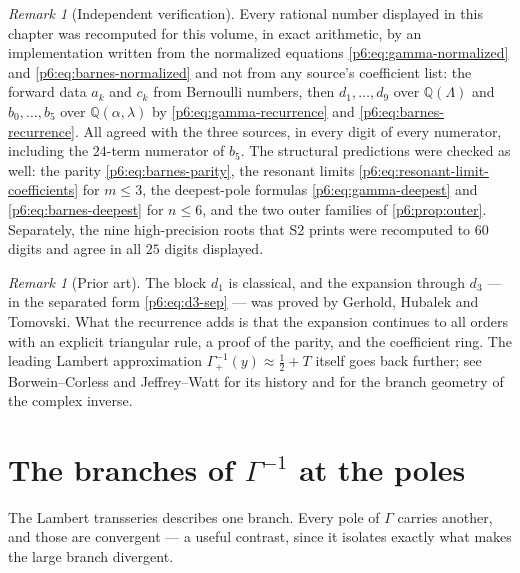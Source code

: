 \documentclass[11pt,a4paper,oneside]{book}
\theoremstyle{plain}
\theoremstyle{definition}
\theoremstyle{remark}
\newtheorem{remark}[theorem]{Remark}
\newcommand{\Rat}{\mathbb{Q}}
\begin{document}
\begin{remark}[Independent verification]\label{p6:rem:verification}
Every rational number displayed in this chapter was recomputed for this
volume, in exact arithmetic, by an implementation written from the normalized
equations \eqref{p6:eq:gamma-normalized} and \eqref{p6:eq:barnes-normalized}
and not from any source's coefficient list: the forward data $a_k$ and $c_k$
from Bernoulli numbers, then $d_1,\dots,d_9$ over $\Rat(\Lambda)$ and
$b_0,\dots,b_5$ over $\Rat(\alpha,\lambda)$ by \eqref{p6:eq:gamma-recurrence}
and \eqref{p6:eq:barnes-recurrence}.  All agreed with the three sources, in
every digit of every numerator, including the $24$-term numerator of $b_5$.
The structural predictions were checked as well: the parity
\eqref{p6:eq:barnes-parity}, the resonant limits
\eqref{p6:eq:resonant-limit-coefficients} for $m\le3$, the deepest-pole
formulas \eqref{p6:eq:gamma-deepest} and \eqref{p6:eq:barnes-deepest} for
$n\le6$, and the two outer families of \cref{p6:prop:outer}.  Separately, the
nine high-precision roots that S2 prints were recomputed to $60$ digits and
agree in all $25$ digits displayed.
\end{remark}

\begin{remark}[Prior art]\label{p6:rem:prior-art}
The block $d_1$ is classical, and the expansion through $d_3$ --- in the
separated form \eqref{p6:eq:d3-sep} --- was proved by Gerhold, Hubalek and
Tomovski.  What the recurrence adds is that the expansion continues to all
orders with an explicit triangular rule, a proof of the parity, and the
coefficient ring.  The leading Lambert approximation $\Gamma_+^{-1}(y)\approx
\tfrac12+T$ itself goes back further; see Borwein--Corless and
Jeffrey--Watt for its history and for the branch geometry of the complex
inverse.
\end{remark}

\section{The branches of \texorpdfstring{$\Gamma^{-1}$}{Gamma inverse} at the poles}
\label{p6:sec:pole-branches}

The Lambert transseries describes one branch.  Every pole of $\Gamma$ carries
another, and those are convergent --- a useful contrast, since it isolates
exactly what makes the large branch divergent.
\end{document}
